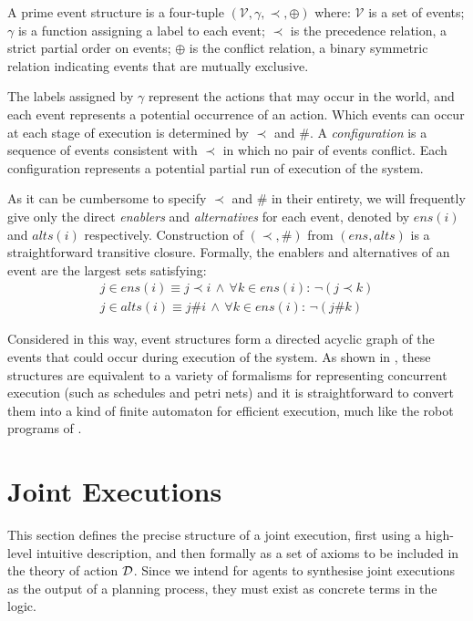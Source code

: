 \begin{defnL}
 A prime event structure is a four-tuple
$(\mathcal{V},\gamma,\prec,\oplus)$ where: $\mathcal{V}$ is a set
of events; $\gamma$ is a function assigning a\textbf{ }label to each
event; $\prec$ is the precedence relation, a strict partial order
on events; $\oplus$ is the conflict relation, a binary symmetric
relation indicating events that are mutually exclusive. 
\end{defnL}
The labels assigned by $\gamma$ represent the actions that may occur
in the world, and each event represents a potential occurrence of
an action. Which events can occur at each stage of execution is determined
by $\prec$ and $\#$. A \emph{configuration} is a sequence of events
consistent with $\prec$ in which no pair of events conflict. Each
configuration represents a potential partial run of execution of the
system.

As it can be cumbersome to specify $\prec$ and $\#$ in their entirety,
we will frequently give only the direct \emph{enablers} and \emph{alternatives}
for each event, denoted by $ens(i)$ and $alts(i)$ respectively.
Construction of $(\prec,\#)$ from $(ens,alts)$ is a straightforward
transitive closure. Formally, the enablers and alternatives of an
event are the largest sets satisfying:\begin{gather*}
j\in ens(i)\equiv j\prec i\,\wedge\,\forall k\in ens(i):\,\neg(j\prec k)\\
j\in alts(i)\equiv j\#i\,\wedge\,\forall k\in ens(i):\,\neg(j\#k)\end{gather*}


Considered in this way, event structures form a directed acyclic graph
of the events that could occur during execution of the system. As
shown in \citep{pratt91modeling_conc_with_geom}, these structures
are equivalent to a variety of formalisms for representing concurrent
execution (such as schedules and petri nets) and it is straightforward
to convert them into a kind of finite automaton for efficient execution,
much like the robot programs of \citep{levesque98what_robots_can_do}.


\section{Joint Executions\label{sec:JointExec:JEs}}

This section defines the precise structure of a joint execution, first
using a high-level intuitive description, and then formally as a set
of axioms to be included in the theory of action $\mathcal{D}$. Since we
intend for agents to synthesise joint executions as the output of
a planning process, they must exist as concrete terms in the logic.



